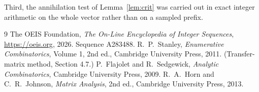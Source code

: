 \documentclass[11pt,a4paper]{article}
\theoremstyle{plain}
\theoremstyle{definition}
\begin{document}
Third, the annihilation test of Lemma~\ref{lem:crit} was carried out in exact integer
arithmetic on the whole vector rather than on a sampled prefix.

\begin{thebibliography}{9}
 The OEIS Foundation, \emph{The On-Line Encyclopedia of Integer
Sequences}, \url{https://oeis.org}, 2026. Sequence A283488.
 R.~P.~Stanley, \emph{Enumerative Combinatorics}, Volume 1, 2nd ed.,
Cambridge University Press, 2011. (Transfer-matrix method, Section 4.7.)
 P.~Flajolet and R.~Sedgewick, \emph{Analytic Combinatorics}, Cambridge
University Press, 2009.
 R.~A.~Horn and C.~R.~Johnson, \emph{Matrix Analysis}, 2nd ed., Cambridge
University Press, 2013.
\end{thebibliography}
\end{document}
